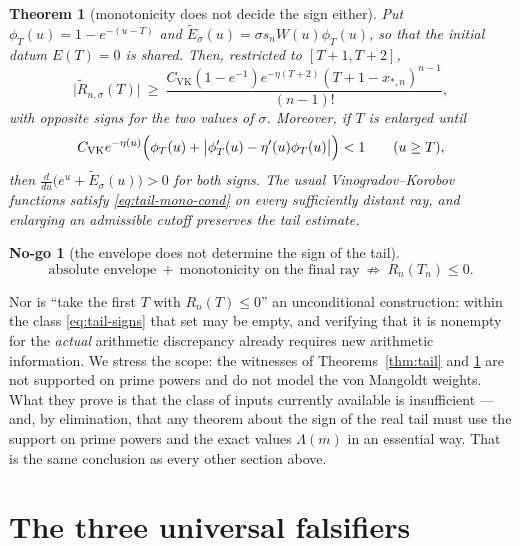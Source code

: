 \documentclass[11pt]{amsart}
\newtheorem{theorem}{Theorem}[section]
\theoremstyle{definition}
\theoremstyle{remark}
\theoremstyle{definition}
\newtheorem{nogo}{No-go}[section]
\begin{document}
\begin{theorem}[monotonicity does not decide the sign either]\label{thm:tail-mono}
Put $\phi_T(u)=1-e^{-(u-T)}$ and $\widetilde E_\sigma(u)=\sigma s_nW(u)\phi_T(u)$, so that the
initial datum $E(T)=0$ is shared. Then, restricted to $[T+1,T+2]$,
\begin{equation}\label{eq:tail-smooth}
   \bigl|\widetilde R_{n,\sigma}(T)\bigr|
   \ \ge\ \frac{C_{\mathrm{VK}}(1-e^{-1})e^{-\eta(T+2)}(T+1-x_{*,n})^{n-1}}{(n-1)!},
\end{equation}
with opposite signs for the two values of $\sigma$. Moreover, if $T$ is enlarged until
\begin{equation}\label{eq:tail-mono-cond}
   C_{\mathrm{VK}}e^{-\eta(u)}
   \Bigl(\phi_T(u)+\bigl|\phi_T'(u)-\eta'(u)\phi_T(u)\bigr|\Bigr)<1
   \qquad(u\ge T),
\end{equation}
then $\tfrac{d}{du}\bigl(e^u+\widetilde E_\sigma(u)\bigr)>0$ for \emph{both} signs. The usual
Vinogradov--Korobov functions satisfy \eqref{eq:tail-mono-cond} on every sufficiently distant ray,
and enlarging an admissible cutoff preserves the tail estimate.
\end{theorem}

\begin{nogo}[the envelope does not determine the sign of the tail]\label{ng:tail}
\begin{equation}\label{eq:tail-nogo}
   \text{absolute envelope}\ +\ \text{monotonicity on the final ray}
   \ \not\Longrightarrow\ R_n(T_n)\le0 .
\end{equation}
\end{nogo}

\noindent Nor is ``take the first $T$ with $R_n(T)\le0$'' an unconditional construction: within the
class \eqref{eq:tail-signs} that set may be empty, and verifying that it is nonempty for the
\emph{actual} arithmetic discrepancy already requires new arithmetic information. We stress the
scope: the witnesses of Theorems~\ref{thm:tail} and \ref{thm:tail-mono} are not supported on prime
powers and do not model the von Mangoldt weights. What they prove is that the class of inputs
currently available is insufficient --- and, by elimination, that any theorem about the sign of the
real tail must use the support on prime powers and the exact values $\Lambda(m)$ in an essential
way. That is the same conclusion as every other section above.

\section{The three universal falsifiers}\label{sec:falsifiers}
\end{document}
